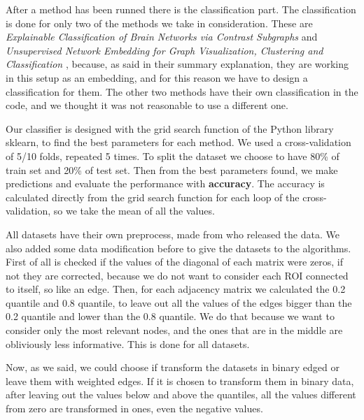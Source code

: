 After a method has been runned there is the classification part. The classification is done for only two of the methods we take in consideration. These are \textit{Explainable Classification of Brain Networks via Contrast Subgraphs} \cite{lanciano2020cs} and \textit{Unsupervised Network Embedding for Graph Visualization, Clustering and Classification} \cite{GutierrezUn}, because, as said in their summary explanation, they are working in this setup as an embedding, and for this reason we have to design a classification for them. The other two methods have their own classification in the code, and we thought it was not reasonable to use a different one.
\vspace{0.5cm}


Our classifier is designed with the grid search function of the Python library sklearn, to find the best parameters for each method. We used a cross-validation of 5/10 folds, repeated 5 times. To split the dataset we choose to have 80\% of train set and 20\% of test set. Then from the best parameters found, we make predictions and evaluate the performance with \textbf{accuracy}. The accuracy is calculated directly from the grid search function for each loop of the cross-validation, so we take the mean of all the values. 
\vspace{0.5cm}

All datasets have their own preprocess, made from who released the data. We also added some data modification before to give the datasets to the algorithms. First of all is checked if the values of the diagonal of each matrix were zeros, if not they are corrected, because we do not want to consider each ROI connected to itself, so like an edge. Then, for each adjacency matrix we calculated the 0.2 quantile and 0.8 quantile, to leave out all the values of the edges bigger than the 0.2 quantile and lower than the 0.8 quantile. We do that because we want to consider only the most relevant nodes, and the ones that are in the middle are obliviously less informative. This is done for all datasets. 
\vspace{0.5cm}

Now, as we said, we could choose if transform the datasets in binary edged or leave them with weighted edges. If it is chosen to transform them in binary data, after leaving out the values below and above the quantiles, all the values different from zero are transformed in ones, even the negative values.

